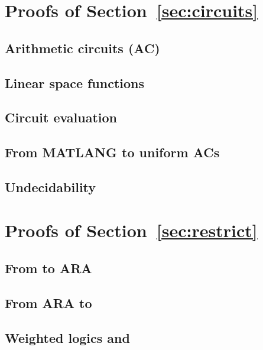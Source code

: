 \section{Proofs of Section~\ref{sec:circuits}}

\subsection{Arithmetic circuits (AC)}


\subsection{Linear space functions}


\subsection{Circuit evaluation}


\subsection{From MATLANG to uniform ACs}


\subsection{Undecidability}



\section{Proofs of Section~\ref{sec:restrict}}

\subsection{From \langsum to ARA}


\subsection{From ARA to \langsum}


% 

% 

\subsection{Weighted logics and \langprod}


